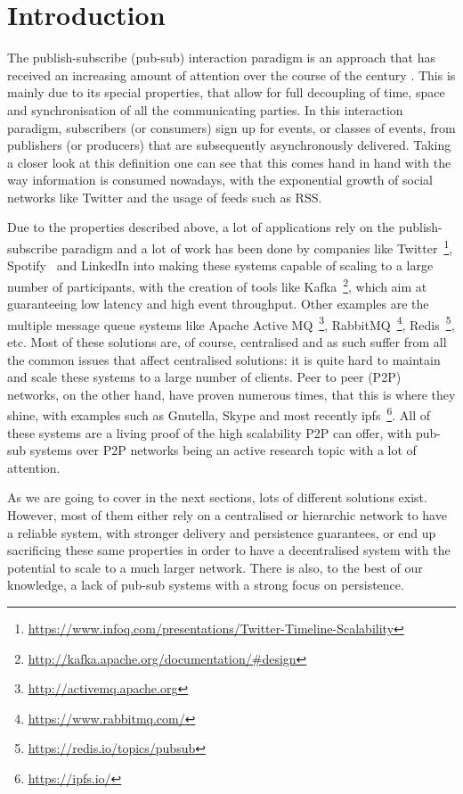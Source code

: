 
\section{Introduction}\label{section:introduction}


The publish-subscribe (pub-sub) interaction paradigm is an approach that has
received an increasing amount of attention over the course of the century
\cite{Kermarrec2013} \cite{Eugster2003}. This is mainly due to its special
properties, that allow for full decoupling of time, space and synchronisation
of all the communicating parties. In this interaction paradigm, subscribers (or
consumers) sign up for events, or classes of events, from publishers (or
producers) that are subsequently asynchronously delivered. Taking a closer look
at this definition one can see that this comes hand in hand with the way
information is consumed nowadays, with the exponential growth of social
networks like Twitter and the usage of feeds such as RSS.

Due to the properties described above, a lot of applications rely on the
publish-subscribe paradigm and a lot of work has been done by companies like
Twitter~\footnote{\url{https://www.infoq.com/presentations/Twitter-Timeline-Scalability}},
Spotify~\cite{Setty2013} and LinkedIn into making these systems capable of
scaling to a large number of participants, with the creation of tools like
Kafka~\footnote{\url{http://kafka.apache.org/documentation/\#design}}, which
aim at guaranteeing low latency and high event throughput. Other examples are
the multiple message queue systems like Apache Active
MQ~\footnote{\url{http://activemq.apache.org}},
RabbitMQ~\footnote{\url{https://www.rabbitmq.com/}},
Redis~\footnote{\url{https://redis.io/topics/pubsub}}, etc. Most of these
solutions are, of course, centralised and as such suffer from all the common
issues that affect centralised solutions: it is quite hard to maintain and
scale these systems to a large number of clients. Peer to peer (P2P) networks,
on the other hand, have proven numerous times, that this is where they shine,
with examples such as Gnutella, Skype and most recently
ipfs~\footnote{\url{https://ipfs.io/}}. All of these systems are a
living proof of the high scalability P2P can offer, with pub-sub
systems over P2P networks being an active research topic with a lot
of attention.

As we are going to cover in the next sections, lots of different solutions
exist. However, most of them either rely on a centralised or hierarchic network
to have a reliable system, with stronger delivery and persistence guarantees,
or end up sacrificing these same properties in order to have a decentralised
system with the potential to scale to a much larger network. There is also, to
the best of our knowledge, a lack of pub-sub systems with a strong focus on
persistence.

